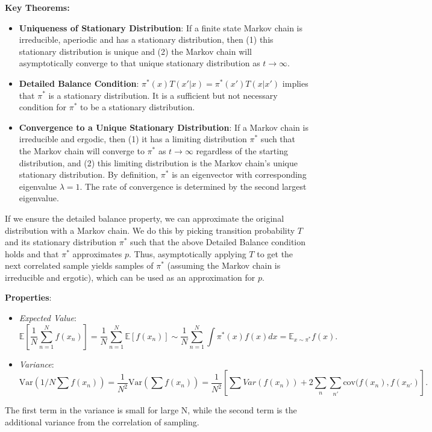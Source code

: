 \documentclass{article}
\begin{document}
\textbf{Key Theorems:}
\begin{itemize}


    \item \textbf{Uniqueness of Stationary Distribution}: If a finite state Markov chain is irreducible, aperiodic and has a stationary distribution, then (1) this stationary distribution is unique and (2) the Markov chain will asymptotically converge to that unique stationary distribution as $ t \rightarrow \infty$.

    \item \textbf{Detailed Balance Condition}:  $\pi^*(x) T(x'|x) = \pi^*(x') T(x|x') $  implies that $\pi^*$ is a stationary distribution. It is a sufficient but not necessary condition for  $\pi^*$ to be a stationary distribution.
    
    \item \textbf{Convergence to a Unique Stationary Distribution}: If a Markov chain is irreducible and ergodic, then (1) it has a limiting distribution $\pi^*$ such that the Markov chain will converge to $\pi^*$ as $ t \rightarrow \infty$ regardless of the starting distribution, and (2) this limiting distribution is the Markov chain's unique stationary distribution. By definition, $\pi^*$ is an eigenvector with corresponding eigenvalue $\lambda = 1$. The rate of convergence is determined by the second largest eigenvalue.

\end{itemize}

If we ensure the detailed balance property, we can approximate the original distribution with a Markov chain.
We do this by picking transition probability $T$ and its stationary distribution $\pi^*$ such that the above Detailed Balance condition holds and that $\pi^*$ approximates $p$. 
Thus, asymptotically applying $T$ to get the next correlated sample yields samples of $\pi^*$ (assuming the Markov chain is irreducible and ergotic), which can be used as an approximation for $p$.  \smallskip  \smallskip

\textbf{Properties}:  \smallskip
\begin{itemize}
    \item \emph{Expected Value}: \[ \mathbb{E}[ \frac{1}{N} \sum_{n=1}^N f(x_n)] = \frac{1}{N} \sum_{n=1}^N \mathbb{E}[f(x_n)] \sim  \frac{1}{N} \sum_{n=1}^N \int \pi^*(x) f(x) dx = \mathbb{E}_{x \sim \pi^*} f(x). \]
    \item \emph{Variance}: \[\mathrm{Var}(1/N \sum f(x_n)) = \frac{1}{N^2} \mathrm{Var}( \sum f(x_n)) = \frac{1}{N^2} [\sum Var(f(x_n)) + 2 \sum_n \sum_{n'} \mathrm{cov}(f(x_n),f(x_{n'})].\] 
\end{itemize}
The first term in the variance is small for large N, while the second term is the additional variance from the correlation of sampling.
\end{document}
